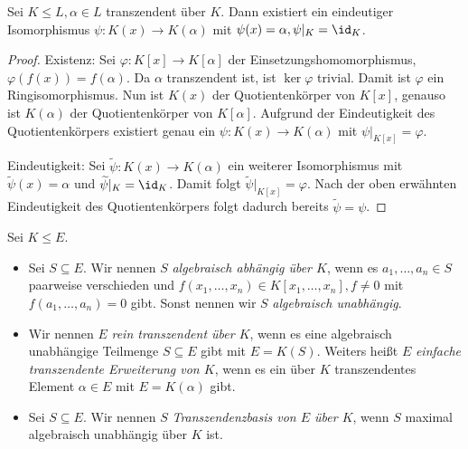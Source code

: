 \begin{proposition}
    Sei $K \leq L, \alpha \in L$ transzendent über $K$. Dann existiert ein eindeutiger Isomorphismus $\psi : K(x) \to K(\alpha)$ mit $\psi(x) = \alpha, \psi \vert_K = \id_K$.
\end{proposition}

\begin{proof}
    Existenz: Sei $\varphi : K[x] \to K[\alpha]$ der Einsetzungshomomorphismus, $\varphi(f(x)) = f(\alpha)$. Da $\alpha$ transzendent ist, ist $\ker \varphi$ trivial. Damit ist $\varphi$ ein Ringisomorphismus. Nun ist $K(x)$ der Quotientenkörper von $K[x]$, genauso ist $K(\alpha)$ der Quotientenkörper von $K[\alpha]$. Aufgrund der Eindeutigkeit des Quotientenkörpers existiert genau ein $\psi : K(x) \to K(\alpha)$ mit $\psi\vert_{K[x]} = \varphi$.

    Eindeutigkeit: Sei $\widetilde{\psi}:K(x)\to K(\alpha)$ ein weiterer Isomorphismus mit $\widetilde{\psi}(x)=\alpha$ und $\widetilde{\psi}\vert_K=\id_K$. Damit folgt $\widetilde{\psi}\vert_{K[x]} = \varphi$. Nach der oben erwähnten Eindeutigkeit des Quotientenkörpers folgt dadurch bereits $\widetilde{\psi} = \psi$.
\end{proof}


\begin{definition}
    Sei $K \leq E$.
    \begin{itemize}
        \item Sei $S \subseteq E$. Wir nennen $S$ \emph{algebraisch abhängig über $K$}, wenn es $a_1,\hdots,a_n\in S$ paarweise verschieden und $ f(x_1, \hdots, x_n) \in K[x_1, \hdots, x_n], f \neq 0$ mit $f(a_1,\hdots,a_n)=0$ gibt.
        Sonst nennen wir $S$ \emph{algebraisch unabhängig}.
        \item Wir nennen $E$ \emph{rein transzendent über $K$}, wenn es eine algebraisch unabhängige Teilmenge $S \subseteq E$ gibt mit $E = K(S)$. Weiters heißt $E$ \emph{einfache transzendente Erweiterung von $K$}, wenn es ein über $K$ transzendentes Element $\alpha\in E$ mit $E=K(\alpha)$ gibt.
        \item Sei $S \subseteq E$. Wir nennen $S$ \emph{Transzendenzbasis von $E$ über $K$}, wenn $S$ maximal algebraisch unabhängig über $K$ ist.
    \end{itemize}
\end{definition}

